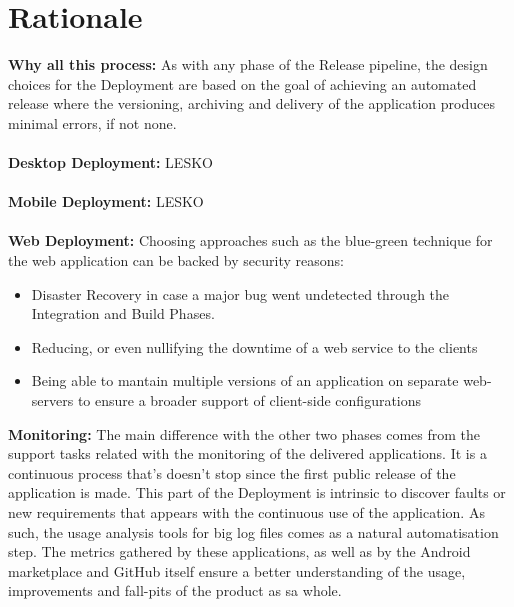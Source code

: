 \documentclass[12pt]{report}
\begin{document}
\section{Rationale}
\textbf{Why all this process:} As with any phase of the Release pipeline, the design choices for the Deployment are based on the goal of achieving an automated release where the versioning, archiving and delivery of the application produces minimal errors, if not none.\\\\
\textbf{Desktop Deployment:} LESKO\\\\
\textbf{Mobile Deployment:} LESKO\\\\
\textbf{Web Deployment:} Choosing approaches such as the blue-green technique for the web application can be backed by security reasons: 
\begin{itemize}
    \item Disaster Recovery in case a major bug went undetected through the Integration and Build Phases.
    \item Reducing, or even nullifying the downtime of a web service to the clients
    \item Being able to mantain multiple versions of an application on separate web-servers to ensure a broader support of client-side configurations
\end{itemize}
\textbf{Monitoring:} The main difference with the other two phases comes from the support tasks related with the monitoring of the delivered applications. It is a continuous process that's doesn't stop since the first public release of the application is made. This part of the Deployment is intrinsic to discover faults or new requirements that appears with the continuous use of the application. As such, the usage analysis tools for big log files comes as a natural automatisation step. The metrics gathered by these applications, as well as by the Android marketplace and GitHub itself ensure a better understanding of the usage, improvements and fall-pits of the product as sa whole.
\end{document}
